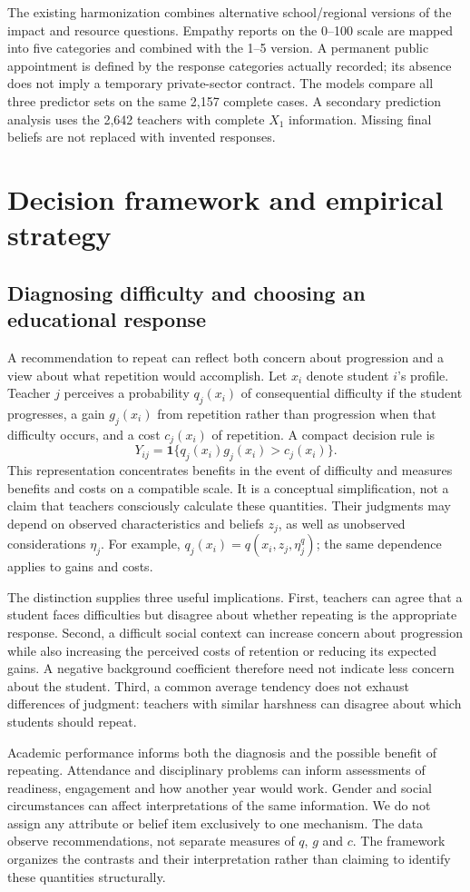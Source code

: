 The existing harmonization combines alternative school/regional versions of the impact and resource questions. Empathy reports on the 0--100 scale are mapped into five categories and combined with the 1--5 version. A permanent public appointment is defined by the response categories actually recorded; its absence does not imply a temporary private-sector contract. The models compare all three predictor sets on the same 2,157 complete cases. A secondary prediction analysis uses the 2,642 teachers with complete $X_1$ information. Missing final beliefs are not replaced with invented responses.

\section{Decision framework and empirical strategy}
\subsection{Diagnosing difficulty and choosing an educational response}
\begin{addition}
A recommendation to repeat can reflect both concern about progression and a view about what repetition would accomplish. Let $x_i$ denote student $i$'s profile. Teacher $j$ perceives a probability $q_j(x_i)$ of consequential difficulty if the student progresses, a gain $g_j(x_i)$ from repetition rather than progression when that difficulty occurs, and a cost $c_j(x_i)$ of repetition. A compact decision rule is
\[
Y_{ij}=\mathbf{1}\{q_j(x_i)g_j(x_i)>c_j(x_i)\}.
\]
This representation concentrates benefits in the event of difficulty and measures benefits and costs on a compatible scale. It is a conceptual simplification, not a claim that teachers consciously calculate these quantities. Their judgments may depend on observed characteristics and beliefs $z_j$, as well as unobserved considerations $\eta_j$. For example, $q_j(x_i)=q(x_i,z_j,\eta_j^q)$; the same dependence applies to gains and costs.

The distinction supplies three useful implications. First, teachers can agree that a student faces difficulties but disagree about whether repeating is the appropriate response. Second, a difficult social context can increase concern about progression while also increasing the perceived costs of retention or reducing its expected gains. A negative background coefficient therefore need not indicate less concern about the student. Third, a common average tendency does not exhaust differences of judgment: teachers with similar harshness can disagree about which students should repeat.

Academic performance informs both the diagnosis and the possible benefit of repeating. Attendance and disciplinary problems can inform assessments of readiness, engagement and how another year would work. Gender and social circumstances can affect interpretations of the same information. We do not assign any attribute or belief item exclusively to one mechanism. The data observe recommendations, not separate measures of $q$, $g$ and $c$. The framework organizes the contrasts and their interpretation rather than claiming to identify these quantities structurally.
\end{addition}


